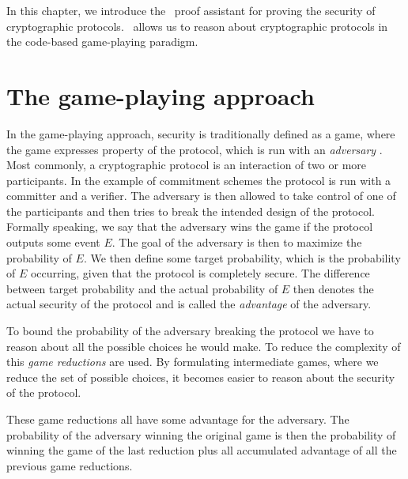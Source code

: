 \label{ch:EasyCrypt}
In this chapter, we introduce the \easycrypt\ proof assistant for proving the security
of cryptographic protocols. \easycrypt\ allows us to reason about cryptographic
protocols in the code-based game-playing paradigm.

\section{The game-playing approach}
\label{sec:game-based-sec}
In the game-playing approach, security is traditionally defined as a game, where
the game expresses property of the protocol, which is run with an
\textit{adversary} \cite{game-playing}. Most commonly, a cryptographic protocol
is an interaction of two or more participants. In the example of commitment schemes
the protocol is run with a committer and a verifier. The adversary is then
allowed to take control of one of the participants and then tries to break the
intended design of the protocol.
Formally speaking, we say that the adversary
wins the game if the protocol outputs some event $E$. The goal of the adversary
is then to maximize the probability of $E$.
We then define some target probability, which is the probability of $E$
occurring, given that the protocol is completely secure. The difference between
target probability and the actual probability of $E$ then denotes the actual
security of the protocol and is called the \textit{advantage} of the adversary.

To bound the probability of the adversary breaking the protocol we have to
reason about all the possible choices he would make. To reduce the complexity of
this \textit{game reductions} are used. By formulating intermediate games, where
we reduce the set of possible choices, it becomes easier to reason
about the security of the protocol.

These game reductions all have some advantage for the adversary. The probability
of the adversary winning the original game is then the probability of winning
the game of the last reduction plus all accumulated advantage of all the
previous game reductions.

